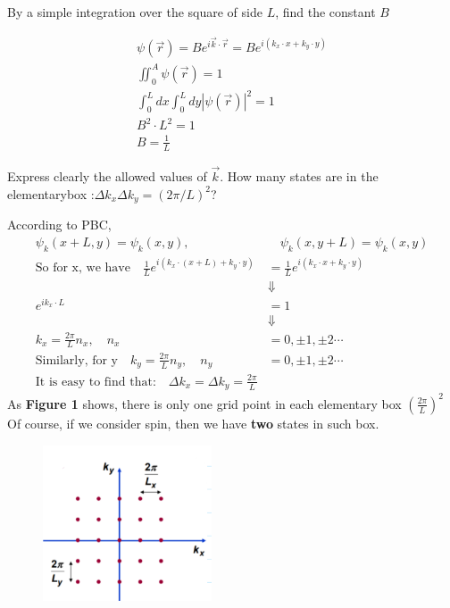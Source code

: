 \documentclass[answers]{exam}
\begin{document}
\begin{questions}
\question By a simple integration over the square of side $L$, find the constant $B$
\begin{solution}
\begin{align*}
\psi(\vec{r})=B e^{i \vec{k} \cdot \vec{r}}=B e^{i\left(k_{x} \cdot x+k_{y} \cdot y\right)}\\
\iint_{0}^{A}\psi(\vec{r}) = 1 \\
\int_{0}^{L}dx\int_{0}^{L}dy|\psi(\vec{r})|^{2} = 1 \\
B^{2} \cdot L^{2} = 1 \\
B = \frac{1}{L}    
\end{align*}
\end{solution}
\newpage
\question Express clearly the allowed values of $\vec{k}$. How many states are in the elementarybox :$\Delta k_{x} \Delta k_{y}=(2 \pi / L)^{2}$?
\begin{solution}
According to PBC,
\begin{align*}
\psi_{k}(x + L, y) = \psi_{k} (x, y),&\quad \psi_{k}(x , y+L) = \psi_{k} (x, y)\\
\text{So for x, we have}\quad\frac{1}{L} e^{i\left(k_{x}\cdot(x+L)+k_{y} \cdot y\right)}&=\frac{1}{L} e^{i\left( k_{x} \cdot x+k_{y} \cdot y\right)} \\
&\Downarrow \\
e^{i k_{x}\cdot  L}&=1 \\
&\Downarrow \\
k_{x}=\frac{2 \pi}{L} n_{x}, \quad n_{x}&=0,\pm 1, \pm 2 \cdots\\
\text{Similarly, for y}\quad k_{y}=\frac{2 \pi}{L} n_{y}, \quad n_{y}&=0,\pm 1, \pm 2 \cdots\\
\text{It is easy to find that:}\quad\Delta k_{x}=\Delta k_{y}=\frac{2 \pi}{L}
\end{align*}
As \textbf{Figure 1} shows, there is only one grid point in each elementary box $\left(\frac{2\pi}{L}\right)^{2}$\\
Of course, if we consider spin, then we have \textbf{two} states in such box.
\end{solution}
\begin{figure}[htbp]
\centering
\begin{minipage}[t]{0.45\textwidth}
\centering
\includegraphics[width=5cm]{Figure/1.png}

\end{minipage}
\end{figure}
\end{questions}
\end{document}
